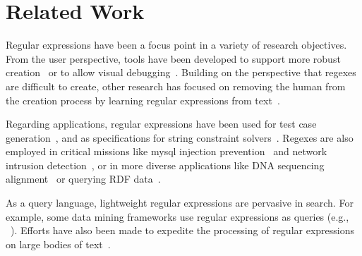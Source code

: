 \section{Related Work}
\label{sec:related}
Regular expressions have been a focus point in a variety of research objectives. From the user perspective, tools have been developed to support more robust creation~\cite{Spishak:2012:TSR:2318202.2318207} or to allow visual debugging~\cite{Beck:2014:RVD:2591062.2591111}.
Building on the perspective that regexes are difficult to create, other research has focused on removing the human from the creation process by learning regular expressions from  text~\cite{Babbar:2010:CBA:1871840.1871848, Li:2008:REL:1613715.1613719}.

Regarding applications, regular expressions have been used for test case generation~\cite{Ghosh:2013:JAT:2486788.2486925, Galler:2014:STD:2683035.2683100, Anand:2013:OSM:2503903.2503991, Tillmann:2014:TAT:2642937.2642941},  and
as specifications for string constraint solvers~\cite{Trinh:2014:SSS:2660267.2660372, hampi}.
Regexes are also employed in critical missions like mysql injection prevention~\cite{Yeole:2011:ADT:1980022.1980229} and network intrusion detection~\cite{network}, or in more diverse applications like DNA sequencing alignment~\cite{1594922} or querying RDF data~\cite{Lee:2010:PSQ:1871871.1871877, Alkhateeb:2009:ESR:1540656.1540975}.


As a query language, lightweight regular expressions are pervasive in search. For example,
some data mining frameworks use regular expressions as queries (e.g., ~\cite{Begel:2010:CDE:1806799.1806821}). Efforts have also been made to expedite the processing of regular expressions on large bodies of text~\cite{Baeza-Yates:1996:FTS:235809.235810}.





